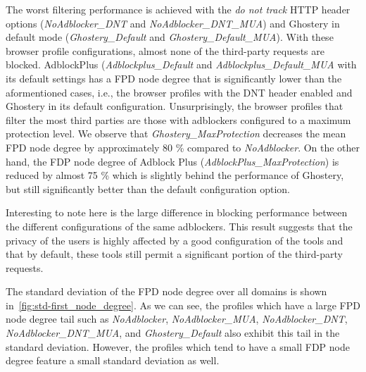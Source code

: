 \documentclass[compsoc, conference, letterpaper, 10pt, times]{IEEEtran}
\begin{document}
The worst filtering performance is achieved with the \textit{do not track} HTTP header options (\textit{NoAdblocker\_DNT} and \textit{NoAdblocker\_DNT\_MUA}) and Ghostery in default mode (\textit{Ghostery\_Default} and \textit{Ghostery\_Default\_MUA}). With these browser profile configurations, almost none of the third-party requests are blocked. AdblockPlus (\textit{Adblockplus\_Default} and \textit{Adblockplus\_Default\_MUA} with its default settings has a FPD node degree that is significantly lower than the aformentioned cases, i.e., the browser profiles with the DNT header enabled and Ghostery in its default configuration. Unsurprisingly, the browser profiles that filter the most third parties are those with adblockers configured to a maximum protection level. We observe that \textit{Ghostery\_MaxProtection} decreases the mean FPD node degree by approximately 80 \% compared to \textit{NoAdblocker}. On the other hand, the FDP node degree of Adblock Plus (\textit{AdblockPlus\_MaxProtection}) is reduced by almost 75 \% which is slightly behind the performance of Ghostery, but still significantly better than the default configuration option. 

Interesting to note here is the large difference in blocking performance between the different configurations of the same adblockers. This result suggests that the privacy of the users is highly affected by a good configuration of the tools and that by default, these tools still permit a significant portion of the third-party requests.

The standard deviation of the FPD node degree over all domains is shown in~\ref{fig:std-first_node_degree}. As we can see, the profiles which have a large FPD node degree tail such as \textit{NoAdblocker}, \textit{NoAdblocker\_MUA}, \textit{NoAdblocker\_DNT}, \textit{NoAdblocker\_DNT\_MUA}, and \textit{Ghostery\_Default} also exhibit this tail in the standard deviation. However, the profiles which tend to have a small FDP node degree feature a small standard deviation as well. 





\end{document}
